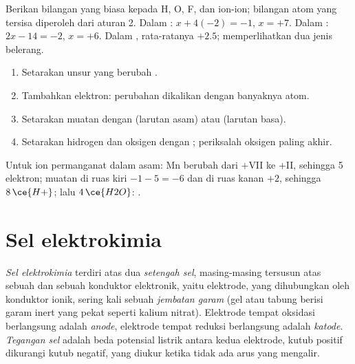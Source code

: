\begin{method}\label{met:b1:nernst:oxidation-numbers}
Berikan bilangan yang biasa kepada H, O, F, dan ion-ion; bilangan atom
yang tersisa diperoleh dari aturan 2. Dalam : $x + 4(-2) = -1$,
$x = +7$. Dalam : $2x - 14 = -2$, $x = +6$. Dalam
, rata-ratanya $+2.5$;  memperlihatkan dua jenis
belerang.
\end{method}

\begin{method}\label{met:b1:nernst:balance-by-on}
\begin{enumerate}
  \item Setarakan unsur yang berubah .
  \item Tambahkan elektron: perubahan  dikalikan dengan
        banyaknya atom.
  \item Setarakan muatan dengan  (larutan asam) atau 
        (larutan basa).
  \item Setarakan hidrogen dan oksigen dengan ; periksalah
        oksigen paling akhir.
\end{enumerate}
Untuk ion permanganat dalam asam: Mn berubah dari $+$VII ke $+$II,
sehingga 5 elektron; muatan di ruas kiri $-1 - 5 = -6$ dan di ruas kanan
$+2$, sehingga $8\,\ce{H+}$; lalu $4\,\ce{H2O}$:
.
\end{method}

\section{Sel elektrokimia}

\begin{definition}\label{def:b1:nernst:cell}
\emph{Sel elektrokimia} terdiri atas dua
\emph{setengah sel}, masing-masing tersusun atas
sebuah  dan sebuah konduktor elektronik, yaitu elektrode,
yang dihubungkan oleh konduktor ionik, sering kali sebuah \emph{jembatan
garam} (gel atau tabung berisi garam inert yang
pekat seperti kalium nitrat). Elektrode tempat oksidasi berlangsung
adalah \emph{anode}, elektrode tempat reduksi berlangsung
adalah \emph{katode}.
\emph{Tegangan sel} adalah beda potensial listrik antara kedua elektrode, kutub positif
dikurangi kutub negatif, yang diukur ketika tidak ada arus yang
mengalir.
\end{definition}

